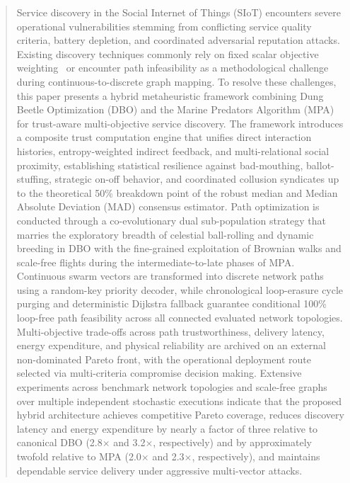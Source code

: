\documentclass[journal,compsoc]{IEEEtran}
\begin{document}
\begin{abstract}
Service discovery in the Social Internet of Things (SIoT) encounters severe operational vulnerabilities stemming from conflicting service quality criteria, battery depletion, and coordinated adversarial reputation attacks. Existing discovery techniques commonly rely on fixed scalar objective weighting~\cite{dahan2024innovative, singh2022trust} or encounter path infeasibility as a methodological challenge during continuous-to-discrete graph mapping. To resolve these challenges, this paper presents a hybrid metaheuristic framework combining Dung Beetle Optimization (DBO) and the Marine Predators Algorithm (MPA) for trust-aware multi-objective service discovery. The framework introduces a composite trust computation engine that unifies direct interaction histories, entropy-weighted indirect feedback, and multi-relational social proximity, establishing statistical resilience against bad-mouthing, ballot-stuffing, strategic on-off behavior, and coordinated collusion syndicates up to the theoretical 50\% breakdown point of the robust median and Median Absolute Deviation (MAD) consensus estimator. Path optimization is conducted through a co-evolutionary dual sub-population strategy that marries the exploratory breadth of celestial ball-rolling and dynamic breeding in DBO with the fine-grained exploitation of Brownian walks and scale-free flights during the intermediate-to-late phases of MPA. Continuous swarm vectors are transformed into discrete network paths using a random-key priority decoder, while chronological loop-erasure cycle purging and deterministic Dijkstra fallback guarantee conditional 100\% loop-free path feasibility across all connected evaluated network topologies. Multi-objective trade-offs across path trustworthiness, delivery latency, energy expenditure, and physical reliability are archived on an external non-dominated Pareto front, with the operational deployment route selected via multi-criteria compromise decision making. Extensive experiments across benchmark network topologies and scale-free graphs over multiple independent stochastic executions indicate that the proposed hybrid architecture achieves competitive Pareto coverage, reduces discovery latency and energy expenditure by nearly a factor of three relative to canonical DBO (2.8$\times$ and 3.2$\times$, respectively) and by approximately twofold relative to MPA (2.0$\times$ and 2.3$\times$, respectively), and maintains dependable service delivery under aggressive multi-vector attacks.
\end{abstract}
\end{document}

